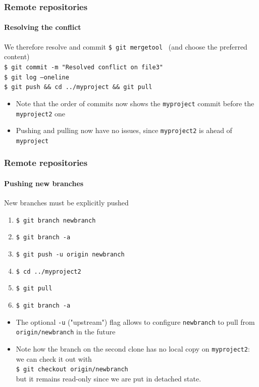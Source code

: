 \begin{frame}
\frametitle{Remote repositories}
\framesubtitle{Resolving the conflict}

\begin{block}{We therefore resolve and commit}
\texttt{\$ git mergetool} \,\,\,(and choose the preferred content)\\
\texttt{\$ git commit -m "Resolved conflict on file3"} \\
\texttt{\$ git log ---oneline} \\
\texttt{\$ git push \&\& cd ../myproject \&\& git pull} 

\begin{itemize}
\item Note that the order of commits now shows the \texttt{myproject} commit before the \texttt{myproject2} one
\item Pushing and pulling now have no issues, since \texttt{myproject2} is ahead of \texttt{myproject}
\end{itemize}
\end{block}

\end{frame}

\begin{frame}
\frametitle{Remote repositories}
\framesubtitle{Pushing new branches}

\begin{block}{New branches must be explicitly pushed}
\begin{enumerate}
\item \texttt{\$ git branch newbranch}
\item \texttt{\$ git branch -a}
\item \texttt{\$ git push -u origin newbranch}
\item \texttt{\$ cd ../myproject2}
\item \texttt{\$ git pull}
\item \texttt{\$ git branch -a}
\end{enumerate}

\begin{itemize}
\item The optional \texttt{-u} ("upstream") flag allows to configure \texttt{newbranch} to pull from \texttt{origin/newbranch} in the future
\item Note how the branch on the second clone has no local copy on \texttt{myproject2}: we can check it out with \\
\texttt{\$ git checkout origin/newbranch} \\
but it remains read-only since we are put in detached state.
\end{itemize}
\end{block}

\end{frame}

